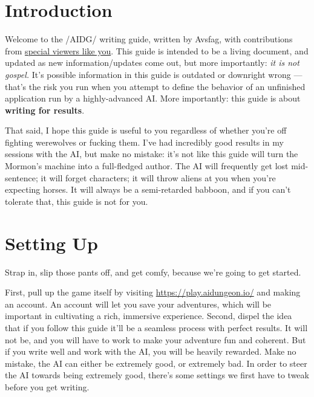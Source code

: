 \documentclass[Avsfag-main.tex]{subfiles}
\begin{document}
\chapter{Introduction}

Welcome to the /AIDG/ writing guide, written by Avsfag, with contributions from
\href{https://www.google.com/search?q=Severely+autistic+children\&source=lnms\&tbm=isch\&sa=X\&ved=2ahUKEwjMyu-tpYXrAhWSGs0KHStBDwYQ_AUoAnoECA8QBA\&biw=1792\&bih=948\&dpr=2}{special viewers like you}.
This guide is intended to be a living document, and updated as new information/updates come out, but more importantly: \emph{it is not gospel.}
It's possible information in this guide is outdated or downright wrong --- that's the risk you run when you attempt to define the behavior of an unfinished application run by a highly-advanced AI.
More importantly: this guide is about \textbf{writing for results}.

That said, I hope this guide is useful to you regardless of whether you're off fighting werewolves or fucking them.
I've had incredibly good results in my sessions with the AI, but make no mistake: it's not like this guide will turn the Mormon's machine into a full-fledged author.
The AI will frequently get lost mid-sentence; it will forget characters; it will throw aliens at you when you're expecting horses.
It will always be a semi-retarded babboon, and if you can't tolerate that, this guide is not for you.

\chapter{Setting Up}

Strap in, slip those pants off, and get comfy, because we're going to get started.

First, pull up the game itself by visiting
\href{https://play.aidungeon.io/}{https://play.aidungeon.io/} and making an account.
An account will let you save your adventures, which will be important in cultivating a rich, immersive experience.
Second, dispel the idea that if you follow this guide it'll be a seamless process with perfect results.
It will not be, and you will have to work to make your adventure fun and coherent. But if you write well and work with the AI, you will be heavily rewarded.
Make no mistake, the AI can either be extremely good, or extremely bad.
In order to steer the AI towards being extremely good, there's some settings we first have to tweak before you get writing.
\end{document}
